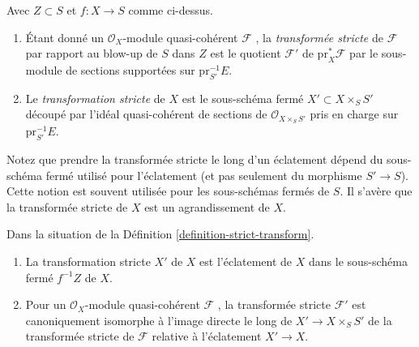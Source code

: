 \begin{definition}
\label{definition-strict-transform}
Avec  $Z \subset S$  et  $f : X \to S$  comme ci-dessus.
\begin{enumerate}
\item Étant donné un  $\mathcal{O}_X$-module quasi-cohérent  $\mathcal{F}$ , la
 {\it  transformée stricte}  de  $\mathcal{F}$  par
rapport au blow-up de  $S$  dans  $Z$  est le quotient  $\mathcal{F}'$ 
de  $\text{pr}_X^*\mathcal{F}$  par le sous-module de sections supportées sur  $\text{pr}_{S'}^{-1}E$.
\item Le  {\it transformation stricte}  de  $X$ est
le sous-schéma fermé $X' \subset X \times_S S'$  découpé par l'idéal quasi-cohérent de sections de
 $\mathcal{O}_{X \times_S S'}$ pris en charge sur $\text{pr}_{S'}^{-1}E$.
\end{enumerate}
\end{definition}

\noindent
Notez que prendre la transformée stricte le long d'un éclatement dépend du
sous-schéma fermé utilisé pour l'éclatement (et pas seulement du
morphisme $S' \to S$). Cette notion est souvent utilisée pour les sous-schémas
fermés de  $S$. Il s'avère que la transformée stricte de  $X$  est
un agrandissement de  $X$.

\begin{lemma}
\label{lemma-strict-transform}
Dans la situation de la Définition  \ref{definition-strict-transform}.
\begin{enumerate}
\item La transformation stricte $X'$  de  $X$  est l'éclatement de
 $X$ dans le sous-schéma fermé $f^{-1}Z$  de  $X$.
\item Pour un  $\mathcal{O}_X$-module quasi-cohérent  $\mathcal{F}$ , la transformée stricte
 $\mathcal{F}'$  est canoniquement isomorphe à l'image directe le long de  $X' \to X \times_S S'$ 
de la transformée stricte de  $\mathcal{F}$  relative à l'éclatement  $X' \to X$.
\end{enumerate}
\end{lemma}

